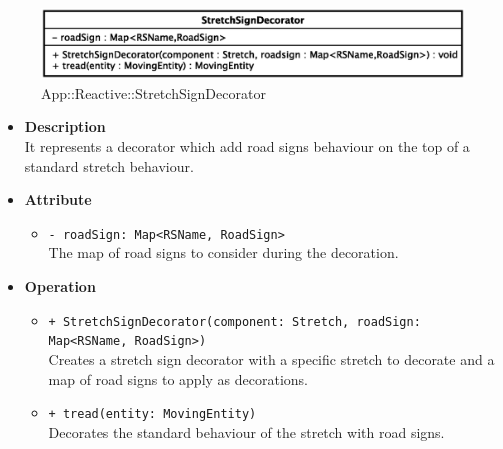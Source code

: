 \begin{figure}[h]
\centering
\includegraphics[scale=0.6,keepaspectratio]{images/solution/stretch_sign_decorator.eps}
\caption{App::Reactive::StretchSignDecorator}
\label{fig:sd-app-stretch_sign_decorator}
\end{figure}
\FloatBarrier
\begin{itemize}
  \item \textbf{Description} \\
    It represents a decorator which add road signs behaviour on the top of a standard stretch behaviour. 
  \item \textbf{Attribute}
  \begin{itemize}
    \item \texttt{- roadSign: Map<RSName, RoadSign>} \\
The map of road signs to consider during the decoration.
  \end{itemize}
  \item \textbf{Operation}
   \begin{itemize} 
   \item \texttt{+ StretchSignDecorator(component: Stretch, roadSign: Map<RSName, RoadSign>)} \\
Creates a stretch sign decorator with a specific stretch to decorate and a map of road signs to apply as decorations.
    \item \texttt{+ tread(entity: MovingEntity)} \\
Decorates the standard behaviour of the stretch with road signs.  
  \end{itemize}
\end{itemize}
